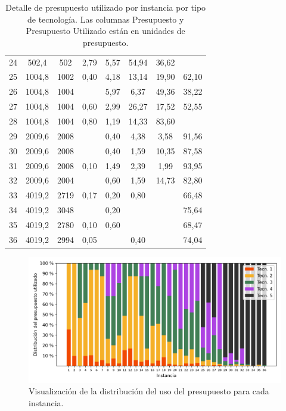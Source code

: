 \documentclass{article}
\begin{document}
\begin{table}
\begin{tabular}{cccccccc}
        24 & 502,4 & 502 & 2,79 & 5,57 & 54,94 & 36,62 &  \\
        25 & 1004,8 & 1002 & 0,40 & 4,18 & 13,14 & 19,90 & 62,10 \\
        26 & 1004,8 & 1004 &  & 5,97 & 6,37 & 49,36 & 38,22 \\
        27 & 1004,8 & 1004 & 0,60 & 2,99 & 26,27 & 17,52 & 52,55 \\
        28 & 1004,8 & 1004 & 0,80 & 1,19 & 14,33 & 83,60 &  \\
        29 & 2009,6 & 2008 &  & 0,40 & 4,38 & 3,58 & 91,56 \\
        30 & 2009,6 & 2008 &  & 0,40 & 1,59 & 10,35 & 87,58 \\
        31 & 2009,6 & 2008 & 0,10 & 1,49 & 2,39 & 1,99 & 93,95 \\
        32 & 2009,6 & 2004 &  & 0,60 & 1,59 & 14,73 & 82,80 \\
        33 & 4019,2 & 2719 & 0,17 & 0,20 & 0,80 &  & 66,48 \\
        34 & 4019,2 & 3048 &  & 0,20 &  &  & 75,64 \\
        35 & 4019,2 & 2780 & 0,10 & 0,60 &  &  & 68,47 \\
        36 & 4019,2 & 2994 & 0,05 &  & 0,40 &  & 74,04 \\
        \bottomrule
    \end{tabular}
    \caption{Detalle de presupuesto utilizado por instancia por tipo de tecnología. Las columnas Presupuesto y Presupuesto Utilizado están en unidades de presupuesto.} \label{table:sensibilitybudgetusage}
  \end{table}

  \begin{figure}[h!]
    \centering
    \includegraphics[width=12cm]{../resources/budget_use_by_infra.png}
    \caption{Visualización de la distribución del uso del presupuesto para cada instancia.}
    \label{fig:sensibilitybudgetusage}
  \end{figure}
\end{document}
